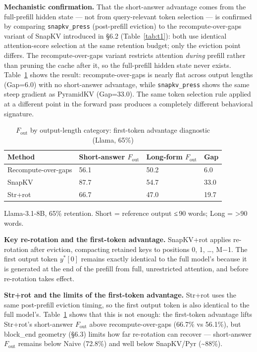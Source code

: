 \documentclass[10pt,letterpaper]{article}
\begin{document}
\textbf{Mechanistic confirmation.} That the short-answer advantage comes
from the full-prefill hidden state --- not from query-relevant token
selection --- is confirmed by comparing \texttt{snapkv\_press}
(post-prefill eviction) to the recompute-over-gaps variant of SnapKV
introduced in §6.2 (Table~\ref{tab:t1}): both use identical
attention-score selection at the same retention budget; only the
eviction point differs. The recompute-over-gaps variant restricts
attention \emph{during} prefill rather than pruning the cache after it,
so the full-prefill hidden state never exists. Table~\ref{tab:rog} shows
the result: recompute-over-gaps is nearly flat across output lengths
(Gap=6.0) with no short-answer advantage, while \texttt{snapkv\_press}
shows the same steep gradient as PyramidKV (Gap=33.0). The same token
selection rule applied at a different point in the forward pass produces
a completely different behavioral signature.

\begin{table}[H]
\centering
\small
\caption{\(F_{\text{out}}\) by output-length category: first-token advantage diagnostic (Llama, 65\%)}
\label{tab:rog}
\begin{tabular}{@{}llll@{}}
\toprule
Method & Short-answer \(F_{\text{out}}\) & Long-form \(F_{\text{out}}\) & Gap\\
\midrule
Recompute-over-gaps & 56.1 & 50.2 & 6.0\\
SnapKV              & 87.7 & 54.7 & 33.0\\
Str+rot             & 66.7 & 47.0 & 19.7\\
\bottomrule
\end{tabular}

\center Llama-3.1-8B, 65\% retention. Short = reference output ≤\,90 words; Long = \textgreater{}90 words.
\end{table}

\textbf{Key re-rotation and the first-token advantage.} SnapKV+rot
applies re-rotation after eviction, compacting retained keys to
positions 0, 1, \ldots, M−1. The first output token \(y^*[0]\) remains
exactly identical to the full model's because it is generated at the end
of the prefill from full, unrestricted attention, and before re-rotation
takes effect.

\textbf{Str+rot and the limits of the first-token advantage.}
Str+rot uses the same post-prefill eviction timing, so the
first output token is also identical to the full model's. Table~\ref{tab:rog}
shows that this is not enough: the first-token advantage lifts Str+rot's
short-answer \(F_{\text{out}}\) above recompute-over-gaps (66.7\% vs
56.1\%), but block\_end geometry (§6.3) limits how far re-rotation can
recover --- short-answer \(F_{\text{out}}\) remains below Naive (72.8\%)
and well below SnapKV/Pyr (\textasciitilde88\%).
\end{document}
